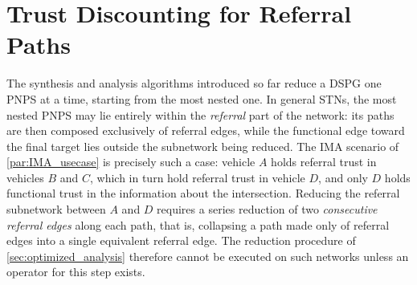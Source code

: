 \section{Trust Discounting for Referral Paths}
\label{sec:referral_path_operator}

The synthesis and analysis algorithms introduced so far reduce a \ac{DSPG} one \ac{PNPS} at a time, starting from the most nested one. In general \acp{STN}, the most nested \ac{PNPS} may lie entirely within the \emph{referral} part of the network: its paths are then composed exclusively of referral edges, while the functional edge toward the final target lies outside the subnetwork being reduced. The \ac{IMA} scenario of \cref{par:IMA_usecase} is precisely such a case: vehicle $A$ holds referral trust in vehicles $B$ and $C$, which in turn hold referral trust in vehicle $D$, and only $D$ holds functional trust in the information about the intersection. Reducing the referral subnetwork between $A$ and $D$ requires a series reduction of two \emph{consecutive referral edges} along each path, that is, collapsing a path made only of referral edges into a single equivalent referral edge. The reduction procedure of \cref{sec:optimized_analysis} therefore cannot be executed on such networks unless an operator for this step exists.

